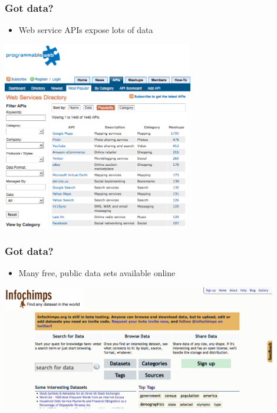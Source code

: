 \documentclass[xcolor=dvipsnames, 9pt]{beamer}
\begin{document}
\begin{frame}
  \frametitle{Got data?}

  \begin{itemize}
    \item Web service APIs expose lots of data
  \end{itemize}

    \begin{center}
      \includegraphics[width=0.625\textwidth]{programmableweb.png}
    \end{center}

\end{frame}

\begin{frame}
  \frametitle{Got data?}

  \begin{itemize}
    \item Many free, public data sets available online
  \end{itemize}

    \begin{center}
      \includegraphics[width=0.9\textwidth]{infochimps.png}
    \end{center}

\end{frame}
\end{document}

